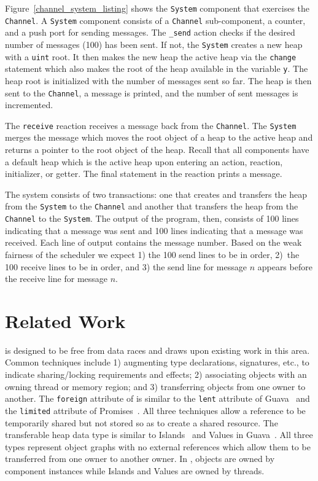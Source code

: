 Figure~\ref{channel_system_listing} shows the \verb+System+ component that exercises the \verb+Channel+.
A \verb+System+ component consists of a \verb+Channel+ sub-component, a counter, and a push port for sending messages.
The \verb+_send+ action checks if the desired number of messages (100) has been sent.
If not, the \verb+System+ creates a new heap with a \verb+uint+ root.
It then makes the new heap the active heap via the \verb+change+ statement which also makes the root of the heap available in the variable \verb+y+.
The heap root is initialized with the number of messages sent so far.
The heap is then sent to the \verb+Channel+, a message is printed, and the number of sent messages is incremented.

The \verb+receive+ reaction receives a message back from the \verb+Channel+.
The \verb+System+ merges the message which moves the root object of a heap to the active heap and returns a pointer to the root object of the heap.
Recall that all components have a default heap which is the active heap upon entering an action, reaction, initializer, or getter.
The final statement in the reaction prints a message.

The system consists of two transactions:  one that creates and transfers the heap from the \verb+System+ to the \verb+Channel+ and another that transfers the heap from the \verb+Channel+ to the \verb+System+.
The output of the program, then, consists of 100 lines indicating that a message was sent and 100 lines indicating that a message was received.
Each line of output contains the message number.
Based on the weak fairness of the scheduler we expect 1) the 100 send lines to be in order, 2)~the 100 receive lines to be in order, and 3) the send line for message $n$ appears before the receive line for message $n$.

\section{Related Work}

\rcgo{} is designed to be free from data races and draws upon existing work in this area.
Common techniques include 1) augmenting type declarations, signatures, etc., to indicate sharing/locking requirements and effects; 2) associating objects with an owning thread or memory region; and 3) transferring objects from one owner to another.
The \verb+foreign+ attribute of \rcgo{} is similar to the \verb+lent+ attribute of Guava~\cite{Bacon:2000:GDJ:353171.353197} and the \verb+limited+ attribute of Promises~\cite{Chan:1998:PLS:302163.302180}.
All three techniques allow a reference to be temporarily shared but not stored so as to create a shared resource.
The transferable heap data type is similar to Islands~\cite{Hogg:1991:IAP:117954.117975} and Values in Guava~\cite{Bacon:2000:GDJ:353171.353197}.
All three types represent object graphs with no external references which allow them to be transferred from one owner to another owner.
In \rcgo{}, objects are owned by component instances while Islands and Values are owned by threads.

